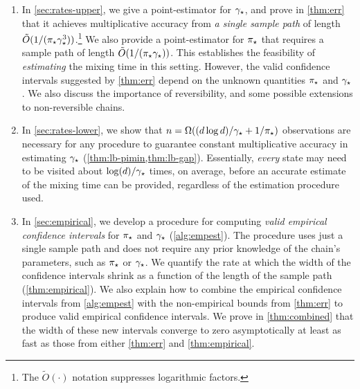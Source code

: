 \begin{enumerate}
  \item
    In \cref{sec:rates-upper}, we give a point-estimator for $\gamma_{\star}$,
    and prove in \cref{thm:err} that it achieves multiplicative
    accuracy from \emph{a single sample path} of length
    $\tilde{O}(1/(\pi_{\star}\gamma_{\star}^3))$.\footnote{The
    $\tilde{O}(\cdot)$ notation suppresses logarithmic factors.}
    We also provide a point-estimator for $\pi_{\star}$ that requires a sample
    path of length $\tilde{O}(1/(\pi_{\star}\gamma_{\star}))$.
    This establishes the feasibility of \emph{estimating} the mixing
    time in this setting.
    However, the valid confidence intervals suggested by
    \cref{thm:err} depend on the unknown quantities $\pi_{\star}$ and
    $\gamma_{\star}$.
    We also discuss the importance of reversibility, and some possible
    extensions to non-reversible chains.

  \item
    In \cref{sec:rates-lower}, we show that $n = \Omega( (d\log
    d)/\gamma_{\star} + 1/\pi_{\star})$ observations are necessary for any procedure
    to guarantee constant multiplicative accuracy in estimating $\gamma_{\star}$
    (\cref{thm:lb-pimin,thm:lb-gap}).
    Essentially, \emph{every} state may need to be visited about
    $\log(d)/\gamma_{\star}$ times, on average, before an accurate estimate of
    the mixing time can be provided, regardless of the estimation
    procedure used.

  \item
    In \cref{sec:empirical}, we develop a procedure for computing
    \emph{valid empirical confidence intervals} for $\pi_{\star}$ and
    $\gamma_{\star}$ (\cref{alg:empest}).
    The procedure uses just a single sample path and does not require
    any prior knowledge of the chain's parameters, such as $\pi_{\star}$ or
    $\gamma_{\star}$.
    We quantify the rate at which the width of the confidence
    intervals shrink as a function of the length of the sample path
    (\cref{thm:empirical}).
    We also explain how to combine the empirical confidence intervals
    from \cref{alg:empest} with the non-empirical bounds from
    \cref{thm:err} to produce valid empirical confidence intervals.
    We prove in \cref{thm:combined} that the width of these new
    intervals converge to zero asymptotically at least as fast as
    those from either \cref{thm:err} and \cref{thm:empirical}.



    

\end{enumerate}

